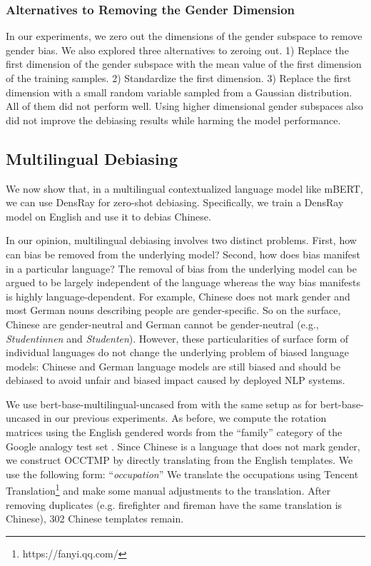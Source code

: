 \subsubsection*{Alternatives to Removing the Gender Dimension}
In our experiments, we zero out the dimensions of the gender
subspace to remove gender bias. 
We also explored three alternatives to zeroing out. 1)
Replace the first dimension of the gender subspace with the
mean value of the first dimension of the training
samples. 2) Standardize the first dimension. 3) Replace the
first dimension with a small random variable sampled from a Gaussian distribution. All of them did not perform well. Using higher dimensional gender subspaces also did not improve the debiasing results while harming the model performance.


\subsection{Multilingual Debiasing}
We now show that, in a multilingual contextualized language model like mBERT, we can use DensRay for zero-shot debiasing. Specifically, we train a DensRay model on English and use it to debias Chinese.

In our opinion, multilingual debiasing involves two distinct
	problems. First, how can bias be removed from the underlying
	model? Second, how does bias manifest in a particular
	language? The removal of bias from the underlying model can
	be argued to be largely independent of the language whereas
	the way bias manifests is highly language-dependent. For
	example, Chinese does not mark gender and most German nouns
	describing people are gender-specific. So on the surface,
	Chinese are gender-neutral and German
	cannot be gender-neutral (e.g., \textit{Studentinnen} and \textit{Studenten}). However, these particularities of surface form of individual
	languages do not change the underlying problem of biased
	language models: Chinese and German language models are
	still biased and should be debiased to avoid unfair and
	biased impact caused by deployed NLP systems.
	
We use  bert-base-multilingual-uncased from
\cite{wolf2019huggingfaces} with the same setup as for
bert-base-uncased in our previous experiments. As before, we
compute the rotation matrices using the English gendered
words from the ``family'' category of the Google analogy
test set \cite{mikolov2013efficient}. Since Chinese is a language that does not mark gender, we construct OCCTMP by directly translating from the English templates. We use the following form:
``\text{[MASK]}\textit{occupation}'' We translate the occupations using Tencent Translation\footnote{https://fanyi.qq.com/} and make some manual adjustments to the translation. After removing duplicates (e.g. firefighter and fireman have the same translation is Chinese), 302 Chinese templates remain.

